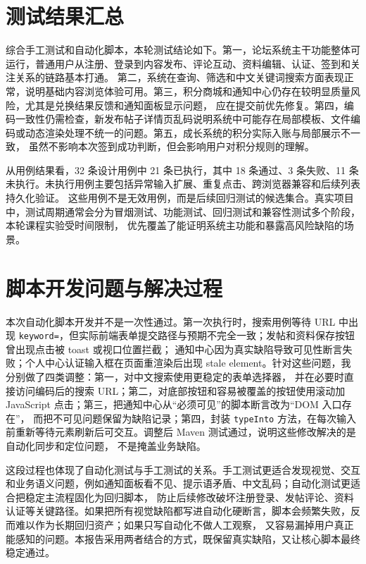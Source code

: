 \documentclass[bwprint]{report}
\begin{document}
\section{测试结果汇总}
综合手工测试和自动化脚本，本轮测试结论如下。第一，论坛系统主干功能整体可运行，普通用户从注册、登录到内容发布、评论互动、资料编辑、认证、签到和关注关系的链路基本打通。
第二，系统在查询、筛选和中文关键词搜索方面表现正常，说明基础内容浏览体验可用。第三，积分商城和通知中心仍存在较明显质量风险，尤其是兑换结果反馈和通知面板显示问题，
应在提交前优先修复。第四，编码一致性仍需检查，新发布帖子详情页乱码说明系统中可能存在局部模板、文件编码或动态渲染处理不统一的问题。第五，成长系统的积分实际入账与局部展示不一致，
虽然不影响本次签到成功判断，但会影响用户对积分规则的理解。

从用例结果看，32 条设计用例中 21 条已执行，其中 18 条通过、3 条失败、11 条未执行。未执行用例主要包括异常输入扩展、重复点击、跨浏览器兼容和后续列表持久化验证。
这些用例不是无效用例，而是后续回归测试的候选集合。真实项目中，测试周期通常会分为冒烟测试、功能测试、回归测试和兼容性测试多个阶段，本轮课程实验受时间限制，
优先覆盖了能证明系统主功能和暴露高风险缺陷的场景。

\section{脚本开发问题与解决过程}
本次自动化脚本开发并不是一次性通过。第一次执行时，搜索用例等待 URL 中出现 \texttt{keyword=}，但实际前端表单提交路径与预期不完全一致；发帖和资料保存按钮曾出现点击被 toast 或视口位置拦截；
通知中心因为真实缺陷导致可见性断言失败；个人中心认证输入框在页面重渲染后出现 stale element。针对这些问题，我分别做了四类调整：第一，对中文搜索使用更稳定的表单选择器，
并在必要时直接访问编码后的搜索 URL；第二，对底部按钮和容易被覆盖的按钮使用滚动加 JavaScript 点击；第三，把通知中心从“必须可见”的脚本断言改为“DOM 入口存在”，
而把不可见问题保留为缺陷记录；第四，封装 \texttt{typeInto} 方法，在每次输入前重新等待元素刷新后可交互。调整后 Maven 测试通过，说明这些修改解决的是自动化同步和定位问题，
不是掩盖业务缺陷。

这段过程也体现了自动化测试与手工测试的关系。手工测试更适合发现视觉、交互和业务语义问题，例如通知面板看不见、提示语矛盾、中文乱码；自动化测试更适合把稳定主流程固化为回归脚本，
防止后续修改破坏注册登录、发帖评论、资料认证等关键路径。如果把所有视觉缺陷都写进自动化硬断言，脚本会频繁失败，反而难以作为长期回归资产；如果只写自动化不做人工观察，
又容易漏掉用户真正能感知的问题。本报告采用两者结合的方式，既保留真实缺陷，又让核心脚本最终稳定通过。
\end{document}
